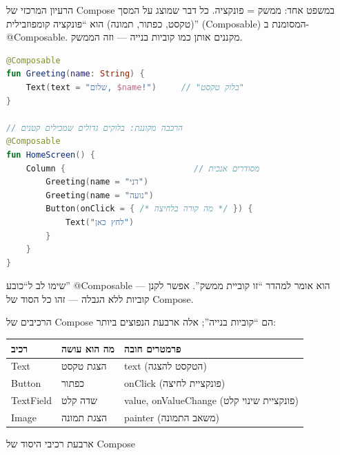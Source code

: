 


הרעיון המרכזי של Compose במשפט אחד: ממשק = פונקציה. כל דבר שמוצג על המסך (טקסט, כפתור, תמונה) הוא “פונקציה קומפוזבילית” (Composable) המסומנת ב-@Composable. מקננים אותן כמו קוביות בנייה — וזה הממשק.

\begin{lstlisting}[language=Kotlin]
@Composable
fun Greeting(name: String) {
    Text(text = "שלום, $name!")     // "בלוק טקסט"
}

// הרכבה מקוננת: בלוקים גדולים שמכילים קטנים
@Composable
fun HomeScreen() {
    Column {                          // מסודרים אנכית
        Greeting(name = "דני")
        Greeting(name = "נועה")
        Button(onClick = { /* מה קורה בלחיצה */ }) {
            Text("לחץ כאן")
        }
    }
}
\end{lstlisting}

שימו לב ל“כובע” @Composable — הוא אומר למהדר “זו קוביית ממשק”. אפשר לקנן קוביות ללא הגבלה — זהו כל הסוד של Compose.


הרכיבים של Compose הם “קוביות בנייה”; אלה ארבעת הנפוצים ביותר:

\begin{center}
\begin{tabularx}{\linewidth}{|X|X|X|}
\hline
\textbf{רכיב} & \textbf{מה הוא עושה} & \textbf{פרמטרים חובה} \tabularnewline
\hline
Text & הצגת טקסט & text (הטקסט להצגה) \tabularnewline
Button & כפתור & onClick (פונקציית לחיצה) \tabularnewline
TextField & שדה קלט & value, onValueChange (פונקציית שינוי קלט) \tabularnewline
Image & הצגת תמונה & painter (משאב התמונה) \tabularnewline
\hline
\end{tabularx}
\end{center}

\begin{center}\small\color{gray}ארבעת רכיבי היסוד של Compose\end{center}


